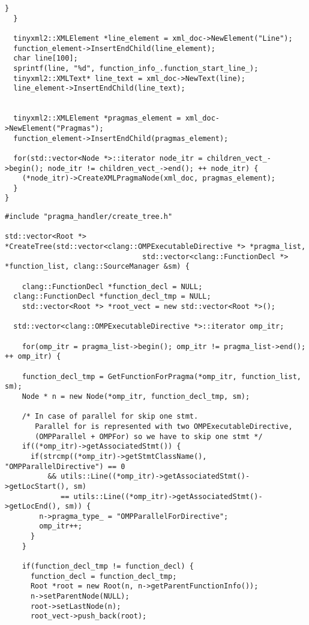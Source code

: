 \documentclass[a4paper,10pt,twoside]{book}
\begin{document}
\begin{lstlisting}[language=CCC, caption=pragma\_handler/Root.cpp]
    }
  }

  tinyxml2::XMLElement *line_element = xml_doc->NewElement("Line");
  function_element->InsertEndChild(line_element); 
  char line[100];
  sprintf(line, "%d", function_info_.function_start_line_);
  tinyxml2::XMLText* line_text = xml_doc->NewText(line);
  line_element->InsertEndChild(line_text);


  tinyxml2::XMLElement *pragmas_element = xml_doc->NewElement("Pragmas");
  function_element->InsertEndChild(pragmas_element);

  for(std::vector<Node *>::iterator node_itr = children_vect_->begin(); node_itr != children_vect_->end(); ++ node_itr) {
    (*node_itr)->CreateXMLPragmaNode(xml_doc, pragmas_element);
  }
}
\end{lstlisting}

\begin{lstlisting}[language=CCC, caption=pragma\_handler/create\_tree.cpp]
#include "pragma_handler/create_tree.h"

std::vector<Root *> *CreateTree(std::vector<clang::OMPExecutableDirective *> *pragma_list,
								std::vector<clang::FunctionDecl *> *function_list, clang::SourceManager &sm) {

	clang::FunctionDecl *function_decl = NULL;
  clang::FunctionDecl *function_decl_tmp = NULL;
	std::vector<Root *> *root_vect = new std::vector<Root *>();

  std::vector<clang::OMPExecutableDirective *>::iterator omp_itr;

	for(omp_itr = pragma_list->begin(); omp_itr != pragma_list->end(); ++ omp_itr) {    

    function_decl_tmp = GetFunctionForPragma(*omp_itr, function_list, sm);
    Node * n = new Node(*omp_itr, function_decl_tmp, sm);

    /* In case of parallel for skip one stmt. 
       Parallel for is represented with two OMPExecutableDirective,
       (OMPParallel + OMPFor) so we have to skip one stmt */
    if((*omp_itr)->getAssociatedStmt()) {
      if(strcmp((*omp_itr)->getStmtClassName(), "OMPParallelDirective") == 0 
          && utils::Line((*omp_itr)->getAssociatedStmt()->getLocStart(), sm) 
             == utils::Line((*omp_itr)->getAssociatedStmt()->getLocEnd(), sm)) {
        n->pragma_type_ = "OMPParallelForDirective";
        omp_itr++;
      }
    }

    if(function_decl_tmp != function_decl) {
      function_decl = function_decl_tmp;
      Root *root = new Root(n, n->getParentFunctionInfo());
      n->setParentNode(NULL);
      root->setLastNode(n);
      root_vect->push_back(root);


\end{lstlisting}
\end{document}
